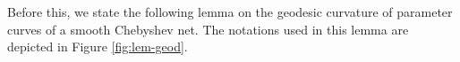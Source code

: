 \documentclass{article}
\renewcommand{\i}{\mathrm{i}}
\newcommand{\halfP}{B}
\theoremstyle{remark}
\theoremstyle{prpart}
\begin{document}


Before this, we state the following lemma on the geodesic curvature of parameter curves of a smooth Chebyshev net. The notations used in this lemma are depicted in Figure \ref{fig:lem-geod}.
\end{document}
